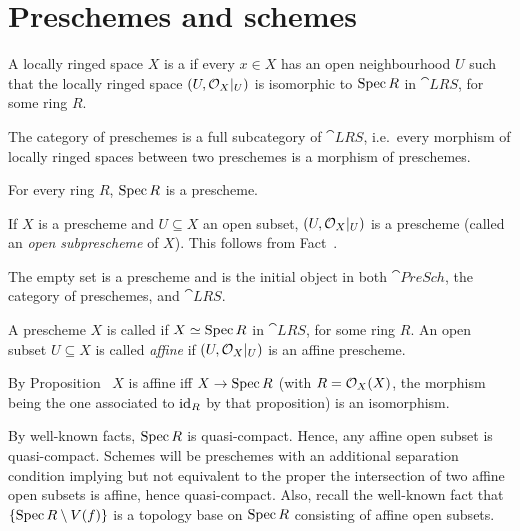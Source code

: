 \documentclass[a4paper,parskip=half,numbers=enddot, DIV=12]{scrreprt}
\begin{document}
\section{Preschemes and schemes}
\begin{defi} 
    A locally ringed space $X$ is a  if every $x\in X$ has an open neighbourhood $U$ such that the locally ringed space $(U,\mathcal{O}_X|_U)$ is isomorphic to $\operatorname{Spec} R$ in $\cat{LRS}$, for some ring $R$. 
    
    The category of preschemes is a full subcategory of $\cat{LRS}$, i.e.\ every morphism of locally ringed spaces between two preschemes is a morphism of preschemes.
\end{defi}
\begin{example}
    For every ring $R$, $\operatorname{Spec} R$ is a prescheme.
\end{example}
\begin{example}
    If $X$ is a prescheme and $U\subseteq X$ an open subset, $(U, \mathcal{O}_X|_U)$ is a prescheme (called an \emph{open subprescheme} of $X$). This follows from Fact~.
\end{example}
\begin{example*}
    The empty set is a prescheme and is the initial object in both $\cat{PreSch}$, the category of preschemes, and $\cat{LRS}$.
\end{example*}
\begin{defi}
    A prescheme $X$ is called  if $X\simeq \operatorname{Spec} R$ in $\cat{LRS}$, for some ring $R$. An open subset $U\subseteq X$ is called \emph{affine} if $(U,\mathcal{O}_X|_U)$ is an affine prescheme.
\end{defi}
\begin{rem*}
    By Proposition~ $X$ is affine iff $X\morphism \Spec R$ (with $R=\mathcal{O}_X(X)$, the morphism being the one associated to $\operatorname{id}_R$ by that proposition) is an isomorphism. 
\end{rem*}
\begin{rem*}
    By well-known facts, $\operatorname{Spec} R$ is quasi-compact. Hence, any affine open subset is quasi-compact. Schemes will be preschemes with an additional separation condition implying but not equivalent to the proper the intersection of two affine open subsets is affine, hence quasi-compact. Also, recall the well-known fact that $\left\{\operatorname{Spec} R\setminus V(f)\right\}$ is a topology base on $\operatorname{Spec} R$ consisting of affine open subsets. 
\end{rem*}
\end{document}
